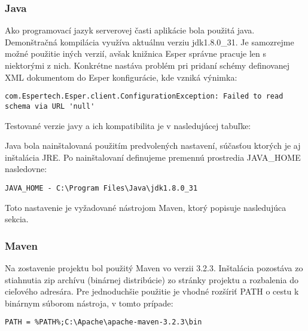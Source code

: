 \subsubsection{Java}	%
	Ako programovací jazyk serverovej časti aplikácie bola použitá java. Demonštračná kompilácia využíva aktuálnu verziu jdk1.8.0\_31. Je samozrejme možné použitie iných verzií, avšak knižnica Esper správne pracuje len s niektorými z nich. Konkrétne nastáva problém pri pridaní schémy definovanej XML dokumentom do Esper konfigurácie, kde vzniká výnimka:
	\begin{lstlisting}[label=lst:exjava,caption=Výnimka pri definovaní XML schémy v niektorých verziách javy]
	com.Espertech.Esper.client.ConfigurationException: Failed to read schema via URL 'null'
	\end{lstlisting}
	
	Testované verzie javy a ich kompatibilita je v nasledujúcej tabuľke:
	
	Java bola nainštalovaná použitím predvolených nastavení, súčasťou ktorých je aj inštalácia JRE. Po nainštalovaní definujeme premennú prostredia JAVA\_HOME nasledovne:
	\begin{lstlisting}[label=lst:javahome,caption=Definícia premennej prostredia JAVA\_HOME]
	JAVA_HOME - C:\Program Files\Java\jdk1.8.0_31
	\end{lstlisting}
	Toto nastavenie je vyžadované nástrojom Maven, ktorý popisuje nasledujúca sekcia.
	
\subsubsection{Maven}	%
	Na zostavenie projektu bol použitý Maven vo verzii 3.2.3. Inštalácia pozostáva zo stiahnutia zip archívu (binárnej distribúcie) zo stránky projektu a rozbalenia do cieľového adresára. Pre jednoduchšie použitie je vhodné rozšíriť PATH o cestu k binárnym súborom nástroja, v tomto prípade:
	\begin{lstlisting}[label=lst:apachepath,caption=Rozšírenie premennej prostredia PATH o nástroj Maven]
	PATH = %PATH%;C:\Apache\apache-maven-3.2.3\bin
	\end{lstlisting}

